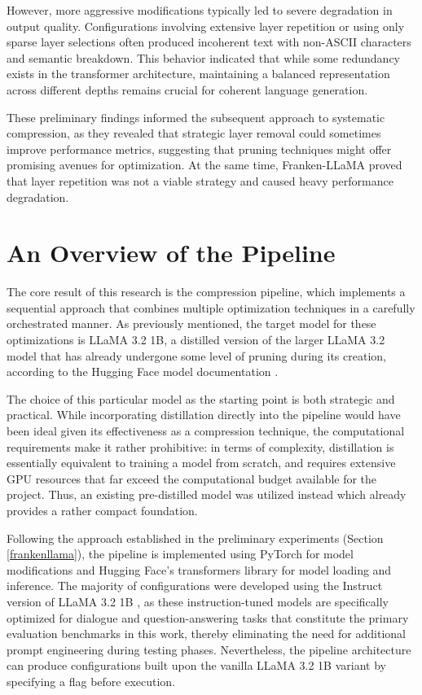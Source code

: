 However, more aggressive modifications typically led to severe degradation in output quality. Configurations involving extensive layer repetition or using only sparse layer selections often produced incoherent text with non-ASCII characters and semantic breakdown. This behavior indicated that while some redundancy exists in the transformer architecture, maintaining a balanced representation across different depths remains crucial for coherent language generation.

These preliminary findings informed the subsequent approach to systematic compression, as they revealed that strategic layer removal could sometimes improve performance metrics, suggesting that pruning techniques might offer promising avenues for optimization. At the same time, Franken-LLaMA proved that layer repetition was not a viable strategy and caused heavy performance degradation.

\section{An Overview of the Pipeline}

The core result of this research is the compression pipeline, which implements a sequential approach that combines multiple optimization techniques in a carefully orchestrated manner. As previously mentioned, the target model for these optimizations is LLaMA 3.2 1B, a distilled version of the larger LLaMA 3.2 model that has already undergone some level of pruning during its creation, according to the Hugging Face model documentation \cite{llama3_1b}.

The choice of this particular model as the starting point is both strategic and practical. While incorporating distillation directly into the pipeline would have been ideal given its effectiveness as a compression technique, the computational requirements make it rather prohibitive: in terms of complexity, distillation is essentially equivalent to training a model from scratch, and requires extensive GPU resources that far exceed the computational budget available for the project. Thus, an existing pre-distilled model was utilized instead which already provides a rather compact foundation.

Following the approach established in the preliminary experiments (Section \ref{frankenllama}), the pipeline is implemented using PyTorch \cite{pytorch} for model modifications and Hugging Face's transformers library \cite{hf_transformers} for model loading and inference. The majority of configurations were developed using the Instruct version of LLaMA 3.2 1B \cite{llama3_1b_instruct}, as these instruction-tuned models are specifically optimized for dialogue and question-answering tasks that constitute the primary evaluation benchmarks in this work, thereby eliminating the need for additional prompt engineering during testing phases. Nevertheless, the pipeline architecture can produce configurations built upon the vanilla LLaMA 3.2 1B variant \cite{llama3_1b} by specifying a flag before execution.

